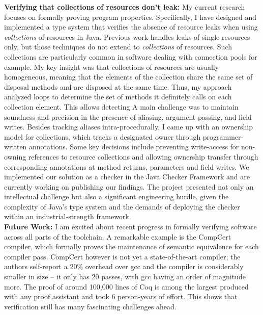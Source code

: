 \documentclass{article}
\begin{document}
\textbf{Verifying that collections of resources don't leak:} My current research focuses on formally proving program properties. Specifically, I have designed and implemented a type system that verifies the absence of resource leaks when using \emph{collections} of resources in Java.
Previous work handles leaks of single resources only, but those techniques do not extend to \emph{collections} of resources. Such collections are particularly common in software dealing with connection pools for example.
My key insight was that collections of resources are usually homogeneous, meaning that the elements of the collection share the same set of disposal methods and are disposed at the same time. Thus, my approach analyzed loops to determine the set of methods it definitely calls on each collection element. This allows detecting
A main challenge was to maintain soundness and precision in the presence of aliasing, argument passing, and field writes. Besides tracking aliases intra-procedurally, I came up with an ownership model for collections, which tracks a designated owner through programmer-written annotations. Some key decisions include preventing write-access for non-owning references to resource collections and allowing ownership transfer through corresponding annotations at method returns, parameters and field writes.
We implemented our solution as a checker in the Java Checker Framework and are currently working on publishing our findings. The project presented not only an intellectual challenge but also a significant engineering hurdle, given the complexity of Java's type system and the demands of deploying the checker within an industrial-strength framework.\\

\textbf{Future Work:}
I am excited about recent progress in formally verifying software across all parts of the toolchain. A remarkable example is the CompCert compiler, which formally proves the maintenance of semantic equivalence for each compiler pass. CompCert however is not yet a state-of-the-art compiler; the authors self-report a 20\% overhead over gcc and the compiler is considerably smaller in size -- it only has 20 passes, with gcc having an order of magnitude more. The proof of around 100,000 lines of Coq is among the largest produced with any proof assistant and took 6 person-years of effort. This shows that verification still has many fascinating challenges ahead.
\end{document}
